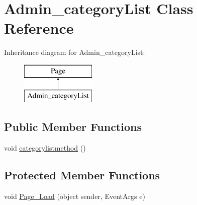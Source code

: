 \hypertarget{class_admin__category_list}{}\section{Admin\+\_\+category\+List Class Reference}
\label{class_admin__category_list}
Inheritance diagram for Admin\+\_\+category\+List\+:\begin{figure}[H]
\begin{center}
\leavevmode
\includegraphics[height=2.000000cm]{class_admin__category_list}
\end{center}
\end{figure}
\subsection*{Public Member Functions}
\begin{DoxyCompactItemize}
\item 
void \mbox{\hyperlink{class_admin__category_list_a1bb5e5965ec5c808c83a9650e8abf823}{categorylistmethod}} ()
\end{DoxyCompactItemize}
\subsection*{Protected Member Functions}
\begin{DoxyCompactItemize}
\item 
void \mbox{\hyperlink{class_admin__category_list_a343f83f56c64f0c94863b13fe1e2eaa7}{Page\+\_\+\+Load}} (object sender, Event\+Args e)
\end{DoxyCompactItemize}
